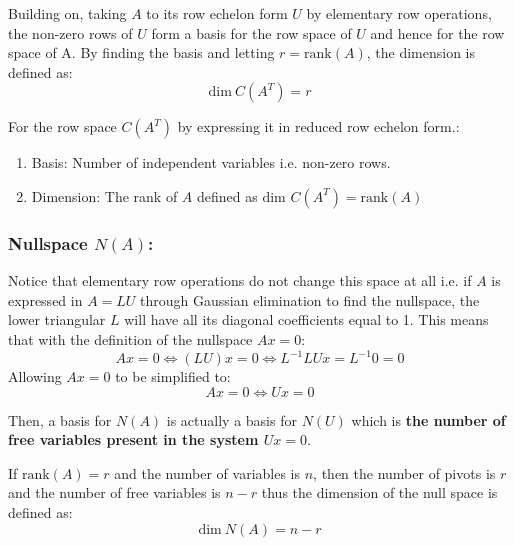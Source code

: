 \documentclass[10pt,a4paper]{article}
\begin{document}
Building on, taking $A$ to its row echelon form $U$ by elementary row operations, the non-zero rows
of $U$ form a basis for the row space of $U$ and hence for the row space of A. By finding the basis
and letting $r = \text{rank}(A)$, the dimension is defined as:
$$
    \text{dim}\: C(A^T) = r
$$

\begin{tcolorbox}[breakable,colback=white]
For the row space $C(A^T)$ by expressing it in reduced row echelon form.:
\begin{enumerate}
    \item Basis: Number of independent variables i.e. non-zero rows.
    \item Dimension: The rank of $A$ defined as $\text{dim }C(A^T)= \text{rank}(A)$ 
\end{enumerate}
\end{tcolorbox}

\subsubsection{Nullspace $N(A)$:}

Notice that elementary row operations do not change this space at all i.e. if $A$ is expressed in
$A=LU$ through Gaussian elimination to find the nullspace, the lower triangular $L$ will have all
its diagonal coefficients equal to 1. This means that with the definition of the nullspace $Ax=0$:
$$
    Ax=0 \Leftrightarrow (LU)x=0 \Leftrightarrow L^{-1}LUx=L^{-1}0=0
$$
Allowing $Ax = 0$ to be simplified to:
$$
    Ax = 0 \Leftrightarrow Ux = 0
$$

Then, a basis for $N(A)$ is actually a basis for $N(U)$ which is \textbf{the number of free variables
present in the system $Ux=0$}.

If $\text{rank}(A)=r$ and the number of variables is $n$, then the number of pivots is $r$ and the
number of free variables is $n-r$ thus the dimension of the null space is defined as:
$$
    \text{dim}\: N(A) = n - r
$$
\end{document}
